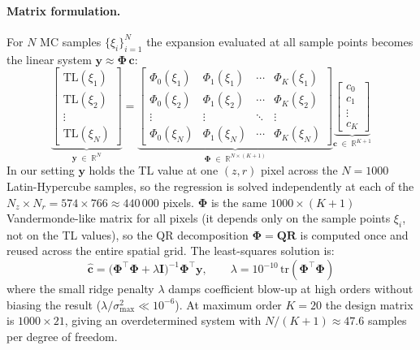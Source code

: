 \documentclass[11pt,a4paper]{article}
\newcommand{\TL}{\mathrm{TL}}
\begin{document}
\paragraph{Matrix formulation.}
For $N$ MC samples $\{\xi_i\}_{i=1}^N$ the expansion evaluated at all sample points
becomes the linear system $\mathbf{y} \approx \boldsymbol\Phi\,\mathbf{c}$:
\begin{equation}
  \underbrace{\begin{bmatrix} \TL(\xi_1) \\ \TL(\xi_2) \\ \vdots \\ \TL(\xi_N) \end{bmatrix}}_{\mathbf{y}\;\in\;\mathbb{R}^{N}}
  =
  \underbrace{\begin{bmatrix}
    \Phi_0(\xi_1) & \Phi_1(\xi_1) & \cdots & \Phi_K(\xi_1) \\
    \Phi_0(\xi_2) & \Phi_1(\xi_2) & \cdots & \Phi_K(\xi_2) \\
    \vdots        & \vdots        & \ddots & \vdots        \\
    \Phi_0(\xi_N) & \Phi_1(\xi_N) & \cdots & \Phi_K(\xi_N)
  \end{bmatrix}}_{\boldsymbol\Phi\;\in\;\mathbb{R}^{N\times(K+1)}}
  \underbrace{\begin{bmatrix} c_0 \\ c_1 \\ \vdots \\ c_K \end{bmatrix}}_{\mathbf{c}\;\in\;\mathbb{R}^{K+1}}
  \label{eq:pce_matrix}
\end{equation}
In our setting $\mathbf{y}$ holds the TL value at one $(z,r)$ pixel across the $N=1000$
Latin-Hypercube samples, so the regression is solved independently at each of the
$N_z \times N_r = 574 \times 766 \approx 440\,000$ pixels.
$\boldsymbol\Phi$ is the same $1000\times(K+1)$ Vandermonde-like matrix for all pixels
(it depends only on the sample points $\xi_i$, not on the TL values), so the QR
decomposition $\boldsymbol\Phi = \mathbf{Q}\mathbf{R}$ is computed once and reused
across the entire spatial grid.
The least-squares solution is:
\begin{equation}
  \hat{\mathbf{c}} = \bigl(\boldsymbol\Phi^\top\boldsymbol\Phi
                    + \lambda\mathbf{I}\bigr)^{-1}\boldsymbol\Phi^\top\mathbf{y},
  \qquad
  \lambda = 10^{-10}\,\mathrm{tr}(\boldsymbol\Phi^\top\boldsymbol\Phi)
  \label{eq:pce_ridge}
\end{equation}
where the small ridge penalty $\lambda$ damps coefficient blow-up at high orders
without biasing the result ($\lambda/\sigma_{\max}^2 \ll 10^{-6}$).
At maximum order $K=20$ the design matrix is $1000\times21$, giving an
overdetermined system with $N/(K+1)\approx47.6$ samples per degree of freedom.
\end{document}
